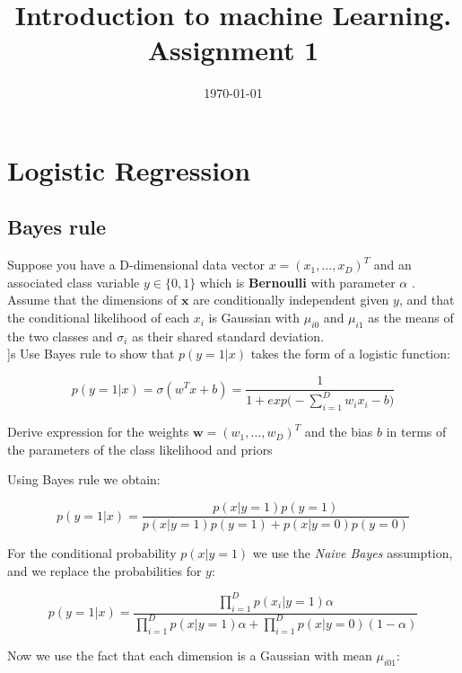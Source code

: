 \documentclass[a4paper]{tufte-handout}
\title{Introduction to machine Learning. Assignment 1}
\date{\today}
\begin{document}
\maketitle

\section{Logistic Regression}%
\label{sec:logreg}

\subsection{Bayes rule}%
\label{sub:baye_s_rule}

Suppose you have a D-dimensional data vector $x=(x_1,\ldots,x_D)^T$ and an
associated class variable $y\in\{0,1\}$ which is \textbf{Bernoulli} with parameter
$\alpha$ . Assume that the dimensions of $\mathbf{x}$ are conditionally
independent given $y$, and that the conditional likelihood of each $x_i$ is
Gaussian with $\mu_{i0}$ and $\mu_{i1}$ as the means of the two classes and
$\sigma_i$ as their shared standard deviation.\\
]s
Use Bayes rule to show that $p(y=1|x)$ takes the form of a logistic function:

\begin{equation}
  p(y=1|x) = \sigma(w^Tx+b) = \dfrac{1}{1 + exp\big(-\sum_{i=1}^D w_ix_i-b\big)}
\end{equation}

Derive expression for the weights $\mathbf{w}= (w_1,\ldots,w_D)^T$ and the bias
$b$ in terms of the parameters of the class likelihood and priors

Using Bayes rule we obtain:

\begin{equation*}
  p(y=1|x) =  \dfrac{p(x|y=1)p(y=1)}{p(x|y=1)p(y=1)+p(x|y=0)p(y=0)}
\end{equation*}

For the conditional probability $p(x|y=1)$ we use the \emph{Naive Bayes}
assumption, and we replace the probabilities for $y$:


\begin{equation}
  p(y=1|x) = \dfrac{ \prod_{i=1}^D
  p(x_i|y=1)\alpha}{\prod_{i=1}^Dp(x|y=1)\alpha+\prod_{i=1}^Dp(x|y=0)(1-\alpha)}
\end{equation}


Now we use the fact that each dimension is a Gaussian with mean $\mu_{i01}$:
\end{document}
